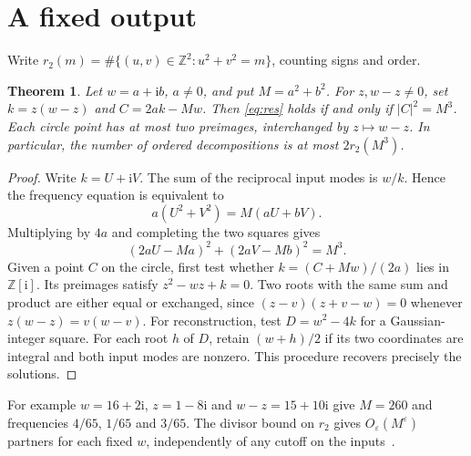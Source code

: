 \documentclass[11pt]{article}
\newtheorem{theorem}{Theorem}
\newcommand{\ZZ}{\mathbb Z}
\newcommand{\ii}{\mathrm i}
\begin{document}
\section{A fixed output}
Write $r_2(m)=\#\{(u,v)\in\ZZ^2:u^2+v^2=m\}$, counting signs and order.
\begin{theorem}\label{th:circle}
Let $w=a+\ii b$, $a\ne0$, and put $M=a^2+b^2$. For $z,w-z\ne0$, set $k=z(w-z)$ and $C=2ak-Mw$. Then \eqref{eq:res} holds if and only if $|C|^2=M^3$. Each circle point has at most two preimages, interchanged by $z\mapsto w-z$. In particular, the number of ordered decompositions is at most $2r_2(M^3)$.
\end{theorem}
\begin{proof}
Write $k=U+\ii V$. The sum of the reciprocal input modes is $w/k$. Hence the frequency equation is equivalent to
\[
 a(U^2+V^2)=M(aU+bV).
\]
Multiplying by $4a$ and completing the two squares gives
\[
 (2aU-Ma)^2+(2aV-Mb)^2=M^3.
\]
Given a point $C$ on the circle, first test whether $k=(C+Mw)/(2a)$ lies in $\ZZ[\ii]$. Its preimages satisfy $z^2-wz+k=0$. Two roots with the same sum and product are either equal or exchanged, since $(z-v)(z+v-w)=0$ whenever $z(w-z)=v(w-v)$. For reconstruction, test $D=w^2-4k$ for a Gaussian-integer square. For each root $h$ of $D$, retain $(w+h)/2$ if its two coordinates are integral and both input modes are nonzero. This procedure recovers precisely the solutions.
\end{proof}
For example $w=16+2\ii$, $z=1-8\ii$ and $w-z=15+10\ii$ give $M=260$ and frequencies $4/65$, $1/65$ and $3/65$. The divisor bound on $r_2$ gives $O_\varepsilon(M^\varepsilon)$ partners for each fixed $w$, independently of any cutoff on the inputs~\cite[Theorems 278 and 315]{HW}.
\end{document}

